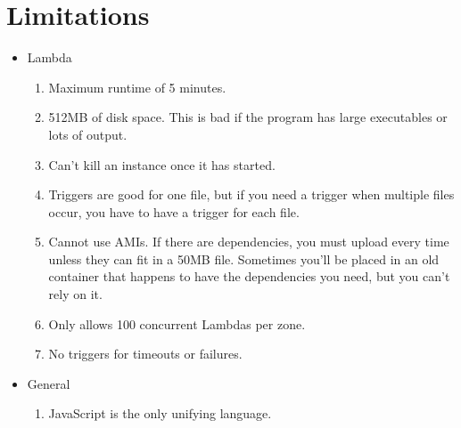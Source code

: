 \vspace{-0.15in}
\section{Limitations}
\begin{itemize}
\item Lambda
\begin{enumerate}
\item Maximum runtime of 5 minutes.
\item 512MB of disk space. This is bad if the program has large executables or lots of output.
\item Can't kill an instance once it has started.
\item Triggers are good for one file, but if you need a trigger when multiple files occur, you have to have a trigger for each file.
\item Cannot use AMIs. If there are dependencies, you must upload every time unless they can fit in a 50MB file. Sometimes you'll be placed in an old container that happens to have the dependencies you need, but you can't rely on it.
\item Only allows 100 concurrent Lambdas per zone.
\item No triggers for timeouts or failures.
\end{enumerate}
\item General
\begin{enumerate}
\item JavaScript is the only unifying language.
\end{enumerate}
\end{itemize}

